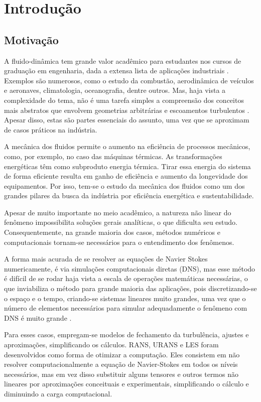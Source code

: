 \chapter[Introdução]{Introdução}
\label{sec:introduction}

\section{Motivação}
A fluido-dinâmica tem grande valor acadêmico para estudantes nos cursos de graduação em engenharia, dada a extensa lista de aplicações industriais \cite{CFD_in_learing_2}. Exemplos são numerosos, como o estudo da combustão, aerodinâmica de veículos e aeronaves, climatologia, oceanografia, dentre outros.
Mas, haja vista a complexidade do tema, não é uma tarefa simples a compreensão dos conceitos mais abstratos que envolvem geometrias arbitrárias e escoamentos turbulentos \cite{hasan}. Apesar disso, estas são partes essenciais do assunto, uma vez que se aproximam de casos práticos na indústria.

A mecânica dos fluidos permite o aumento na eficiência de processos mecânicos, como, por exemplo, no caso das máquinas térmicas. As transformações energéticas têm como subproduto energia térmica. Tirar essa energia do sistema de forma eficiente resulta em ganho de eficiência e aumento da longevidade dos equipamentos. Por isso, tem-se o estudo da mecânica dos fluidos como um dos grandes pilares da busca da indústria por eficiência energética e sustentabilidade.

Apesar de muito importante no meio acadêmico, a natureza não linear do fenômeno \cite{John} impossibilita soluções gerais analíticas, o que dificulta seu estudo. Consequentemente, na grande maioria dos casos, métodos numéricos e computacionais tornam-se necessários para o entendimento dos fenômenos.

A forma mais acurada de se resolver as equações de Navier Stokes numericamente, é via simulações computacionais diretas (DNS), mas esse método é difícil de se rodar haja vista a escala de operações matemáticas necessárias, o que inviabiliza o método para grande maioria das aplicações, pois discretizando-se o espaço e o tempo, criando-se sistemas lineares muito grandes, uma vez que o número de elementos necessários para simular adequadamente o fenômeno com DNS é muito grande \cite{Kawamura}.

Para esses casos, empregam-se modelos de fechamento da turbulência, ajustes e aproximações, simplificando os cálculos. RANS, URANS e LES foram desenvolvidos como forma de otimizar a computação. Eles consistem em não resolver computacionalmente a equação de Navier-Stokes em todos os níveis necessários, mas em vez disso substituir alguns tensores e outros termos não lineares por aproximações conceituais e experimentais, simplificando o cálculo e diminuindo a carga computacional.

